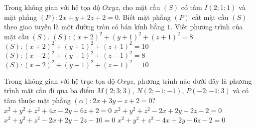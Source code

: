 \begin{ex}%
	Trong không gian với hệ tọa độ $Oxyz$, cho mặt cầu $\left( S \right)$ có tâm $I\left( 2;1;1 \right)$ và mặt phẳng $\left( P \right)\colon2x+y+2z+2=0$. Biết mặt phẳng $\left( P \right)$ cắt mặt cầu $\left( S \right)$ theo giao tuyến là một đường tròn có bán kính bằng $1$. Viết phương trình của mặt cầu $\left( S \right)$.
	\choice
	{$\left( S \right)\colon\left( x+2 \right)^2+\left( y+1 \right)^2+\left( z+1 \right)^2=8$}
	{$\left( S \right)\colon\left( x+2 \right)^2+\left( y+1 \right)^2+\left( z+1 \right)^2=10$}
	{$\left( S \right)\colon\left( x-2 \right)^2+\left( y-1 \right)^2+\left( z-1 \right)^2=8$}
	{\True $\left( S \right)\colon\left( x-2 \right)^2+\left( y-1 \right)^2+\left( z-1 \right)^2=10$}
\end{ex}

\begin{ex}%
	Trong không gian với hệ trục tọa độ $Oxyz$, phương trình nào dưới đây là phương trình mặt cầu đi qua ba điểm $M\left( 2;3;3 \right)$, $N\left( 2;-1;-1 \right)$, $P\left( -2;-1;3 \right)$ và có tâm thuộc mặt phẳng $\left( \alpha \right)\colon2x+3y-z+2=0$?
	\choice
	{$x^2+y^2+z^2+4x-2y+6z+2=0$}
	{$x^2+y^2+z^2-2x+2y-2z-2=0$}
	{$x^2+y^2+z^2-2x+2y-2z-10=0$}
	{\True $x^2+y^2+z^2-4x+2y-6z-2=0$}
\end{ex}

